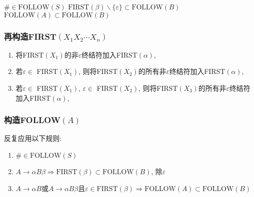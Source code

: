 \begin{algorithm}
\begin{algorithmic}[1]
                        \State {}
                            \State $\#\in\textrm{FOLLOW}(S)$
                                    \State $\textrm{FIRST}(\beta)\backslash\{\varepsilon\}\subset\textrm{FOLLOW}(B)$
                                \EndIf
                                    \State $\textrm{FOLLOW}(A)\subset\textrm{FOLLOW}(B)$
                                \EndIf
                            \EndWhile
                        \EndProcedure
                    \end{algorithmic}
                \end{algorithm}


            \subsubsection{再构造FIRST$(X_1X_2\cdots X_n)$}

                \begin{enumerate}
                    \item 将FIRST$(X_1)$的非$\varepsilon$终结符加入FIRST$(\alpha)$,
                    \item 若$\varepsilon\in$ FIRST$(X_1)$, 则将FIRST$(X_2)$的所有非$\varepsilon$终结符加入FIRST$(\alpha)$,
                    \item 若$\varepsilon\in$ FIRST$(X_1)$, $\varepsilon\in$ FIRST$(X_2)$, 则将FIRST$(X_3)$的所有非$\varepsilon$终结符加入FIRST$(\alpha)$,
                \end{enumerate}

            \subsubsection{构造FOLLOW$(A)$}

                反复应用以下规则:

                \begin{enumerate}
                    \item $\#\in\textrm{FOLLOW}(S)$
                    \item $A\to \alpha B\beta\Rightarrow\textrm{FIRST}(\beta)\subset\textrm{FOLLOW}(B)$, 除$\varepsilon$
                    \item $A\to \alpha B$或$A\to \alpha B\beta$且$\varepsilon\in\textrm{FIRST}(\beta)\Rightarrow\textrm{FOLLOW}(A)\subset\textrm{FOLLOW}(B)$
                \end{enumerate}

